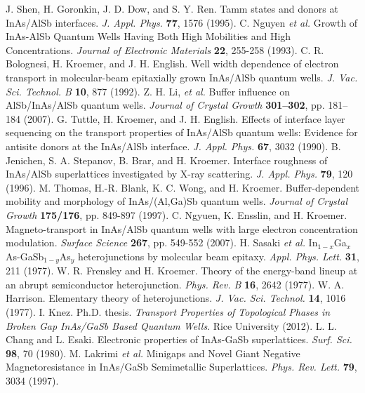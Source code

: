 \documentclass[titlepage,a4paper]{book}
\begin{document}
\begin{thebibliography}{199}
J. Shen, H. Goronkin, J. D. Dow, and S. Y. Ren. Tamm states and donors at InAs/AlSb interfaces. \textit{J. Appl. Phys.} \textbf{77}, 1576 (1995).
C. Nguyen \textit{et al.} Growth of InAs-AlSb Quantum Wells Having Both High Mobilities and High Concentrations. \textit{Journal of Electronic Materials} \textbf{22}, 255-258 (1993).
C. R. Bolognesi, H. Kroemer, and J. H. English. Well width dependence of electron transport in molecular-beam epitaxially grown InAs/AlSb quantum wells. \textit{J. Vac. Sci. Technol. B} \textbf{10}, 877 (1992).
Z. H. Li, \textit{et al.} Buffer influence on AlSb/InAs/AlSb quantum wells. \textit{Journal of Crystal Growth} \textbf{301–302}, pp. 181–184 (2007).
G. Tuttle, H. Kroemer, and J. H. English. Effects of interface layer sequencing on the transport properties of InAs/AlSb quantum wells: Evidence for antisite donors at the InAs/AlSb interface. \textit{J. Appl. Phys.} \textbf{67}, 3032 (1990).
B. Jenichen, S. A. Stepanov, B. Brar, and H. Kroemer. Interface roughness of InAs/AlSb superlattices investigated by X-ray scattering. \textit{J. Appl. Phys.} \textbf{79}, 120 (1996).
M. Thomas, H.-R. Blank, K. C. Wong, and H. Kroemer. Buffer-dependent mobility and morphology of InAs/(Al,Ga)Sb quantum wells. \textit{Journal of Crystal Growth} \textbf{175/176}, pp. 849-897 (1997).
C. Ngyuen, K. Ensslin, and H. Kroemer. Magneto-transport in InAs/AlSb quantum wells with large electron concentration modulation. \textit{Surface Science} \textbf{267}, pp. 549-552 (2007).
H. Sasaki \textit{et al.} In$_{1-x}$Ga$_x$As-GaSb$_{1-y}$As$_y$ heterojunctions by molecular beam epitaxy. \textit{Appl. Phys. Lett.} \textbf{31}, 211 (1977).
W. R. Frensley and H. Kroemer. Theory of the energy-band lineup at an abrupt semiconductor heterojunction. \textit{Phys. Rev. B} \textbf{16}, 2642 (1977).
W. A. Harrison. Elementary theory of heterojunctions. \textit{J. Vac. Sci. Technol.} \textbf{14}, 1016 (1977).
I. Knez. Ph.D. thesis. \textit{Transport Properties of Topological Phases in Broken Gap InAs/GaSb Based Quantum Wells}. Rice University (2012).
L. L. Chang and L. Esaki. Electronic properties of InAs-GaSb superlattices. \textit{Surf. Sci.} \textbf{98}, 70 (1980).
M. Lakrimi \textit{et al.} Minigaps and Novel Giant Negative Magnetoresistance in InAs/GaSb Semimetallic Superlattices.  \textit{Phys. Rev. Lett.} \textbf{79}, 3034 (1997).

\end{thebibliography}
\end{document}
